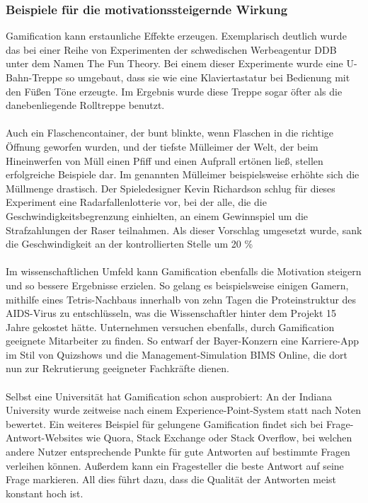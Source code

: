 \subsubsection{Beispiele für die motivationssteigernde Wirkung}
Gamification kann erstaunliche Effekte erzeugen. Exemplarisch deutlich wurde das bei einer Reihe von Experimenten der schwedischen Werbeagentur DDB unter dem Namen \glqq The Fun Theory\grqq . Bei einem dieser Experimente wurde eine U-Bahn-Treppe so umgebaut, dass sie wie eine Klaviertastatur bei Bedienung mit den Füßen Töne erzeugte. Im Ergebnis wurde diese Treppe sogar öfter als die danebenliegende Rolltreppe benutzt. \cite{Src:PlanetWissen} \\ \\
Auch ein Flaschencontainer, der bunt blinkte, wenn Flaschen in die richtige Öffnung geworfen wurden, und der \glqq tiefste Mülleimer der Welt\grqq , der beim Hineinwerfen von Müll einen Pfiff und einen Aufprall ertönen ließ, stellen erfolgreiche Beispiele dar. Im genannten Mülleimer beispielsweise erhöhte sich die Müllmenge drastisch. \cite{Src:PlanetWissen} Der Spieledesigner Kevin Richardson schlug für dieses Experiment eine Radarfallenlotterie vor, bei der alle, die die Geschwindigkeitsbegrenzung einhielten, an einem Gewinnspiel um die Strafzahlungen der Raser teilnahmen. Als dieser Vorschlag umgesetzt wurde, sank die Geschwindigkeit an der kontrollierten Stelle um 20 \% \cite{Src:GamifDesign} \\ \\
Im wissenschaftlichen Umfeld kann Gamification ebenfalls die Motivation steigern und so bessere Ergebnisse erzielen. So gelang es beispielsweise einigen Gamern, mithilfe eines Tetris-Nachbaus innerhalb von zehn Tagen die Proteinstruktur des AIDS-Virus zu entschlüsseln, was die Wissenschaftler hinter dem Projekt 15 Jahre gekostet hätte. \cite{Src:DLFMotiv} Unternehmen versuchen ebenfalls, durch Gamification geeignete Mitarbeiter zu finden. So entwarf der Bayer-Konzern eine Karriere-App im Stil von Quizshows und die Management-Simulation \glqq BIMS Online\grqq , die dort nun zur Rekrutierung geeigneter Fachkräfte dienen. \\ \\
Selbst eine Universität hat Gamification schon ausprobiert: An der Indiana University wurde zeitweise nach einem Experience-Point-System statt nach Noten bewertet. \cite{Src:XPNoten} Ein weiteres Beispiel für gelungene Gamification findet sich bei Frage-Antwort-Websites wie Quora, Stack Exchange oder Stack Overflow, bei welchen andere Nutzer entsprechende Punkte für gute Antworten auf bestimmte Fragen verleihen können. Außerdem kann ein Fragesteller die beste Antwort auf seine Frage markieren. All dies führt dazu, dass die Qualität der Antworten meist konstant hoch ist. \cite{Src:GamifDesign} \\ \\
